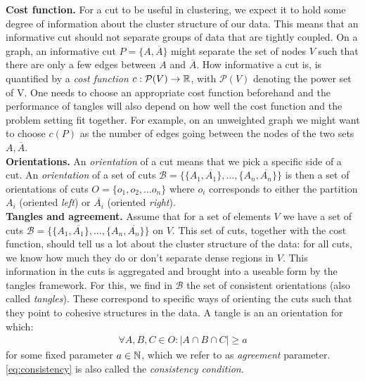\noindent
\textbf{Cost function.} For a cut to be useful in clustering, we expect it to hold some degree of information about the cluster 
structure of our data. This means that an informative cut should not separate groups of data that are tightly coupled.
On a graph, an informative cut $P = \{A, \overline{A}\}$ might separate the set of nodes $V$ such that there 
are only a few edges between $A$ and $\overline{A}$. How informative a cut is, is quantified by a \textit{cost function} $c: \mathcal{P}(V) \to \mathbb{R}$, 
with $\mathcal{P}(V)$ denoting the power set of V. 
One needs to choose an appropriate cost function beforehand and the performance of tangles will also depend on how well the cost function and the problem setting fit together. 
For example, on an unweighted graph we might want to choose $c(P)$ as the number of edges
going between the nodes of the two sets $A, \overline{A}$. \\

\noindent
\textbf{Orientations.}
An \textit{orientation} of a cut means that we pick a specific side of a cut. 
An \textit{orientation} of a set of cuts 
$\mathcal{B} = \{\{A_1, \overline{A_1}\}, \ldots, \{A_n, \overline{A_n}\} \}$ is  
then a set of orientations of cuts $O = \{o_1, o_2, \ldots o_n\}$
where $o_i$ corresponds to either the partition $A_i$ 
(oriented \textit{left}) or $\overline{A_i}$ (oriented \textit{right}). \\ 

\noindent
\textbf{Tangles and agreement.} Assume that for a set of elements $V$ we have a set of cuts $\mathcal{B} = \{\{A_1, \overline{A_1}\}, \ldots, \{A_n, \overline{A_n}\} \} $ on $V$.
This set of cuts, together with the cost function, should tell us a lot about the cluster structure of the data:
for all cuts, we know how much they do or don't separate dense regions in $V$. 
This information in the cuts is aggregated and brought into a useable form by the tangles framework. 
For this, we find in $\mathcal{B}$ the set of consistent orientations (also called \textit{tangles}).  
These correspond to specific ways of orienting the cuts such that they point to cohesive structures in the data.  
A tangle is an an orientation for which:
\begin{align}\label{eq:consistency}
    \forall A,B,C \in O: \left| A \cap B \cap C \right| \ge a
\end{align}
for some fixed parameter $a \in \mathbb{N}$, which we refer to as \textit{agreement} parameter. \autoref{eq:consistency} is also called the \textit{consistency condition}. \\

